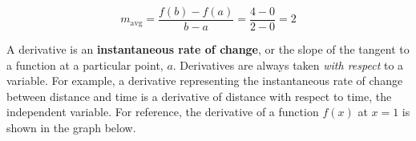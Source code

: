 \documentclass{article}
\begin{document}
            \begin{equation*}
                m_{\text{avg}} = \frac{f(b)-f(a)}{b-a} = \frac{4-0}{2-0} = 2
            \end{equation*}

            \begin{center}
            \end{center}

            \noindent A derivative is an \textbf{instantaneous rate of change}, or the slope of the
            tangent to a function at a particular point, $a$. Derivatives are always taken
            \textit{with respect} to a variable. For example, a derivative representing the
            instantaneous rate of change between distance and time is a derivative of distance
            with respect to time, the independent variable. For reference, the derivative of a
            function $f(x)$ at $x=1$ is shown in the graph below. \\
\end{document}
